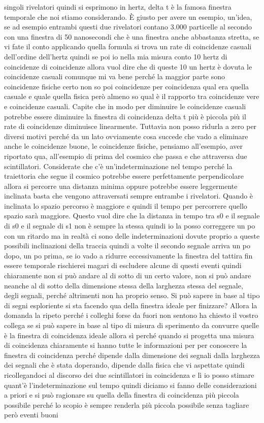 singoli rivelatori quindi si esprimono in hertz, delta t è la famosa finestra temporale che noi stiamo considerando. È giusto per avere un esempio, un'idea, se ad esempio entrambi questi due rivelatori contano 3.000 particelle al secondo con una finestra di 50 nanosecondi che è una finestra anche abbastanza stretta, se vi fate il conto applicando quella formula si trova un rate di coincidenze casuali dell'ordine dell'hertz quindi se poi io nella mia misura conto 10 hertz di coincidenze di coincidenze allora vuol dire che di queste 10 un hertz è dovuta le coincidenze casuali comunque mi va bene perché la maggior parte sono coincidenze fisiche certo non so poi coincidenze per coincidenza qual era quella casuale e quale quella fisica però almeno so qual è il rapporto tra coincidenze vere e coincidenze casuali. Capite che in modo per diminuire le coincidenze casuali potrebbe essere diminuire la finestra di coincidenza delta t più è piccola più il rate di coincidenze diminuisce linearmente. Tuttavia non posso ridurla a zero per diversi motivi perché da un lato ovviamente cosa succede che vado a eliminare anche le coincidenze buone, le coincidenze fisiche, pensiamo all'esempio, aver riportato qua, all'esempio di prima del cosmico che passa e che attraversa due scintillatori. Considerate che c'è un'indeterminazione nel tempo perché la traiettoria che segue il cosmico potrebbe essere perfettamente perpendicolare allora si percorre una distanza minima oppure potrebbe essere leggermente inclinata basta che vengono attraversati sempre entrambe i rivelatori. Quando è inclinata lo spazio percorso è maggiore e quindi il tempo per percorrere quello spazio sarà maggiore. Questo vuol dire che la distanza in tempo tra s0 e il segnale di s0 e il segnale di s1 non è sempre la stessa quindi io la posso correggere un po con un ritardo ma in realtà ci sono delle indeterminazioni dovute proprio a queste possibili inclinazioni della traccia quindi a volte il secondo segnale arriva un po dopo, un po prima, se io vado a ridurre eccessivamente la finestra del tattira fin essere temporale rischierei magari di escludere alcune di questi eventi quindi chiaramente non si può andare al di sotto di un certo valore, non si può andare neanche al di sotto della dimensione stessa della larghezza stessa del segnale, degli segnali, perché altrimenti non ha proprio senso. Si può sapere in base al tipo di segni esploriente si sta facendo qua della finestra ideale per finizzare? Allora la domanda la ripeto perché i colleghi forse da fuori non sentono ha chiesto il vostro collega se si può sapere in base al tipo di misura di sperimento da convurre quelle è la finestra di coincidenza ideale allora sì perché quando si progetta una misura di coincidenza chiaramente si hanno tutte le informazioni per per conoscere la finestra di coincidenza perché dipende dalla dimensione dei segnali dalla larghezza dei segnali che è stata doperando, dipende dalla fisica che vi aspettate quindi ricollegandoci al discorso dei due scintillatori in coincidenza e lì io posso stimare quant'è l'indeterminazione sul tempo quindi diciamo si fanno delle considerazioni a priori e si può ragionare su quella della finestra di coincidenza più piccola possibile perché lo scopio è sempre renderla più piccola possibile senza tagliare però eventi buoni 